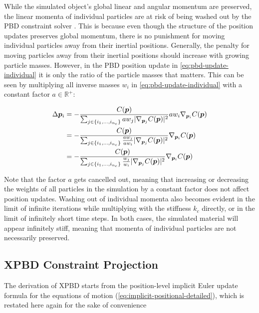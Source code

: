 While the simulated object's global linear and angular momentum are preserved, the linear momenta of individual particles are at risk of 
being washed out by the PBD constraint solver \cite{bouaziz2014}. This is because even though the structure of the position updates 
preserves global momentum, there is no punishment for moving individual particles away from their inertial positions. Generally, the 
penalty for moving particles away from their inertial positions should increase with growing particle masses. However, in the PBD
position update in \autoref{eq:pbd-update-individual} it is only the ratio of the particle masses that matters. This can be seen by multiplying
all inverse masses $w_i$ in \autoref{eq:pbd-update-individual} with a constant factor $a \in \mathbb{R}^+$:

\begin{equation}\label{eq:pbd-masses}
    \begin{split}
        \Delta \bm{p}_i 
        &= -\frac{C(\bm{p})}{\sum_{j \in \{ i_1, \ldots, i_{n_c} \}} aw_j \vert \nabla_{\bm{p}_j}C(\bm{p}) \vert^2 } aw_i \nabla_{\bm{p}_i} C(\bm{p}) \\
        &= -\frac{C(\bm{p})}{\sum_{j \in \{ i_1, \ldots, i_{n_c} \}} \frac{aw_j}{aw_i} \vert \nabla_{\bm{p}_j}C(\bm{p}) \vert^2 } \nabla_{\bm{p}_i} C(\bm{p}) \\
        &= -\frac{C(\bm{p})}{\sum_{j \in \{ i_1, \ldots, i_{n_c} \}} \frac{w_j}{w_i} \vert \nabla_{\bm{p}_j}C(\bm{p}) \vert^2 } \nabla_{\bm{p}_i} C(\bm{p})
    \end{split}
\end{equation}

\noindent Note that the factor $a$ gets cancelled out, meaning that increasing or decreasing the weights of all particles in the simulation by a constant
factor does not affect position updates. Washing out of individual momenta also becomes evident in the limit of infinite iterations while multiplying 
with the stiffness $k_c$ directly, or in the limit of infinitely short time steps. In both cases, the simulated material will appear infinitely stiff, 
meaning that momenta of individual particles are not necessarily preserved.

\subsection{XPBD Constraint Projection}\label{ss:xpbd-constraint-projection}
The derivation of XPBD \cite{macklin2016} starts from the position-level implicit Euler update formula for the equations of motion 
(\cref{eq:implicit-positional-detailed}), which is restated here again for the sake of convenience

